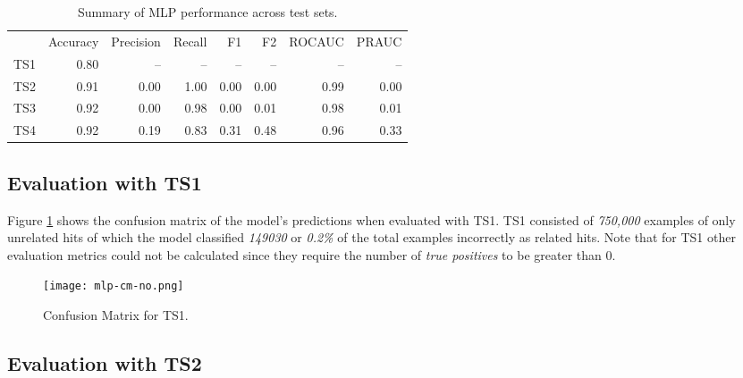 \begin{table}[t]
  \centering
  \begin{tabular}{rrrrrrrr}
    \hline
    & Accuracy & Precision & Recall & F1 & F2 & ROCAUC & PRAUC \\
    TS1 & 0.80 & -- & -- & -- & -- & -- & -- \\
    TS2 & 0.91 & 0.00 & 1.00 & 0.00 & 0.00 & 0.99 & 0.00 \\
    TS3 & 0.92 & 0.00 & 0.98 & 0.00 & 0.01 & 0.98 & 0.01 \\
    TS4 & 0.92 & 0.19 & 0.83 & 0.31 & 0.48 & 0.96 & 0.33 \\
    \hline
  \end{tabular}
  \caption{Summary of MLP performance across test sets.}
  \label{tab:mlp-results}
\end{table}

\subsection{Evaluation with TS1}
\label{sec:mlp-disc-ts1}

Figure \ref{fig:mlp-cm-no} shows the confusion matrix of the model's
predictions when evaluated with TS1. TS1 consisted of \emph{750,000}
examples of only unrelated hits of which the model classified
\emph{149030} or \emph{0.2\%} of the total examples incorrectly as
related hits. Note that for TS1 other evaluation metrics could not be
calculated since they require the number of \emph{true positives} to
be greater than 0.

\begin{figure}[h]
  \centering
  \texttt{[image: mlp-cm-no.png]}
  \caption{Confusion Matrix for TS1.}
  \label{fig:mlp-cm-no}
\end{figure}

\subsection{Evaluation with TS2}
\label{sec:mlp-disc-ts2}


